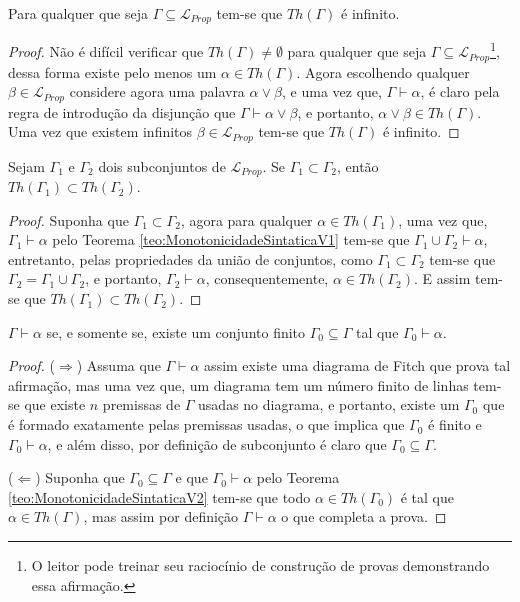 \begin{theorem}
    Para qualquer que seja $\Gamma \subseteq \mathcal{L}_{Prop}$ tem-se que $Th(\Gamma)$ é infinito.
\end{theorem}

\begin{proof}
  Não é difícil verificar que $Th(\Gamma) \neq \emptyset$ para qualquer que seja $\Gamma \subseteq \mathcal{L}_{Prop}$\footnote{O leitor pode treinar seu raciocínio de construção de provas demonstrando essa afirmação.}, dessa forma existe pelo menos um $\alpha \in Th(\Gamma)$. Agora escolhendo qualquer $\beta \in \mathcal{L}_{Prop}$ considere agora uma palavra $\alpha \lor \beta$, e uma vez que, $\Gamma \vdash \alpha$, é claro pela regra de introdução da disjunção que $\Gamma \vdash \alpha \lor \beta$, e portanto, $\alpha \lor \beta \in Th(\Gamma)$. Uma vez que existem infinitos $\beta \in \mathcal{L}_{Prop}$ tem-se que $Th(\Gamma)$ é infinito.
\end{proof}

\begin{theorem}\label{teo:MonotonicidadeSintaticaV2}
    Sejam $\Gamma_1$ e $\Gamma_2$ dois subconjuntos de $\mathcal{L}_{Prop}$. Se $\Gamma_1 \subset \Gamma_2$, então $Th(\Gamma_1) \subset Th(\Gamma_2)$.
\end{theorem}

\begin{proof}
  Suponha que $\Gamma_1 \subset \Gamma_2$, agora para qualquer $\alpha \in Th(\Gamma_1)$, uma vez que, $\Gamma_1 \vdash \alpha$ pelo Teorema \ref{teo:MonotonicidadeSintaticaV1} tem-se que $\Gamma_1 \cup \Gamma_2 \vdash \alpha$, entretanto, pelas propriedades da união de conjuntos, como $\Gamma_1 \subset \Gamma_2$ tem-se que $\Gamma_2 = \Gamma_1 \cup \Gamma_2$, e portanto, $\Gamma_2 \vdash \alpha$, consequentemente, $\alpha \in Th(\Gamma_2)$. E assim tem-se que $Th(\Gamma_1) \subset Th(\Gamma_2)$.
\end{proof}

\begin{theorem}\label{teo:TeoremaDaCompacidade}
    $\Gamma \vdash \alpha$ se, e somente se, existe um conjunto finito $\Gamma_0 \subseteq \Gamma$ tal que $\Gamma_0 \vdash \alpha$.
\end{theorem}

\begin{proof}
  ($\Rightarrow$) Assuma que $\Gamma \vdash \alpha$ assim existe uma diagrama de Fitch que prova tal afirmação, mas uma vez que, um diagrama tem um número finito de linhas tem-se que existe $n$ premissas de $\Gamma$ usadas no diagrama, e portanto, existe um $\Gamma_0$ que é formado exatamente pelas premissas usadas, o que implica que $\Gamma_0$ é finito e $\Gamma_0 \vdash \alpha$, e além disso, por definição de subconjunto é claro que $\Gamma_0 \subseteq \Gamma$.
  
  ($\Leftarrow$) Suponha que $\Gamma_0 \subseteq \Gamma$ e que $\Gamma_0 \vdash \alpha$ pelo Teorema \ref{teo:MonotonicidadeSintaticaV2} tem-se que todo $\alpha \in Th(\Gamma_0)$ é tal que $\alpha \in Th(\Gamma)$, mas assim por definição $\Gamma \vdash \alpha$ o que completa a prova.
\end{proof}

